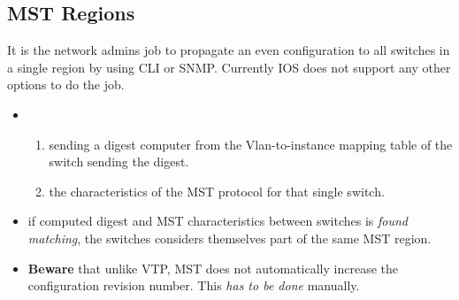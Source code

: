 \subsection{MST Regions}

It is the network admins job to propagate an even configuration to all switches in a single region by using CLI or SNMP. Currently IOS does not support any other options to do the job.

\begin{itemize}
    \item {}
    \begin{enumerate}
        \item sending a digest computer from the Vlan-to-instance mapping table of the switch sending the digest.
        \item the characteristics of the MST protocol for that single switch.
    \end{enumerate}
    \item if computed digest and MST characteristics between switches is \textit{found matching}, the switches considers themselves part of the same MST region.
    \item \textbf{Beware} that unlike VTP, MST does not automatically increase the configuration revision number. This \textit{has to be done} manually.
\end{itemize}

